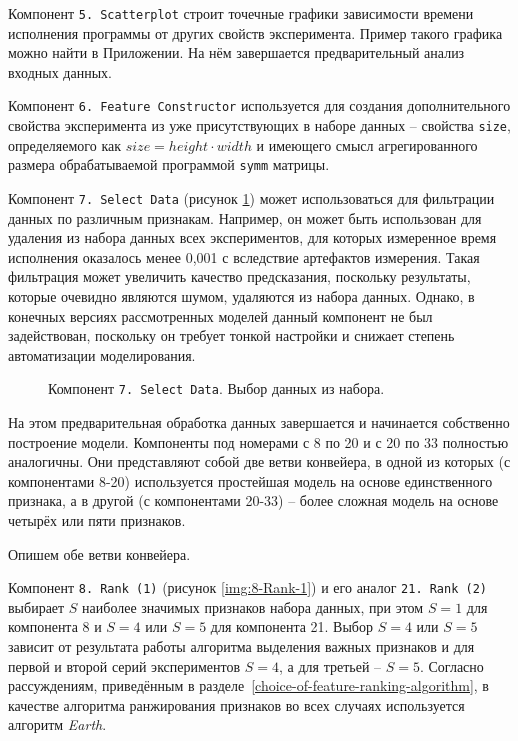 Компонент \texttt{5. Scatterplot} строит точечные графики зависимости времени исполнения программы от других свойств эксперимента. Пример такого графика можно найти в Приложении. На нём завершается предварительный анализ входных данных.

Компонент \texttt{6. Feature Constructor} используется для создания дополнительного свойства эксперимента из уже присутствующих в наборе данных -- свойства \texttt{size}, определяемого как $size = height \cdot width$ и имеющего смысл агрегированного размера обрабатываемой программой \texttt{symm} матрицы.

Компонент \texttt{7. Select Data} (рисунок \ref{img:7-Select-Data}) может использоваться для фильтрации данных по различным признакам. Например, он может быть использован для удаления из набора данных всех экспериментов, для которых измеренное время исполнения оказалось менее 0,001 с вследствие артефактов измерения. Такая фильтрация может увеличить качество предсказания, поскольку результаты, которые очевидно являются шумом, удаляются из набора данных. Однако, в конечных версиях рассмотренных моделей данный компонент не был задействован, поскольку он требует тонкой настройки и снижает степень автоматизации моделирования.

\begin{figure}[H]
    \caption{Компонент \texttt{7. Select Data}. Выбор данных из набора.}
    \label{img:7-Select-Data}
\end{figure}

На этом предварительная обработка данных завершается и начинается собственно построение модели. Компоненты под номерами с 8 по 20 и с 20 по 33 полностью аналогичны. Они представляют собой две ветви конвейера, в одной из которых (с компонентами 8-20) используется простейшая модель на основе единственного признака, а в другой (с компонентами 20-33) -- более сложная модель на основе четырёх или пяти признаков.

Опишем обе ветви конвейера.

Компонент \texttt{8. Rank (1)} (рисунок \ref{img:8-Rank-1}) и его аналог \texttt{21. Rank (2)}  выбирает $S$ наиболее значимых признаков набора данных, при этом $S = 1$ для компонента 8 и $S = 4$ или $S = 5$ для компонента 21. Выбор $S = 4$ или $S = 5$ зависит от результата работы алгоритма выделения важных признаков и для первой и второй серий экспериментов $S = 4$, а для третьей -- $S = 5$. Согласно рассуждениям, приведённым в разделе~\ref{choice-of-feature-ranking-algorithm}, в качестве алгоритма ранжирования признаков во всех случаях используется алгоритм \textit{Earth}.

